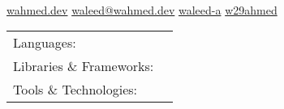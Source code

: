 \documentclass[]{awesome-cv}
\begin{document}
    
\begin{center}
	  \\
	\vspace{2mm}
	\href{https://wahmed.dev}{{\textcolor{darkblue}{\faGlobe} wahmed.dev}}
	\hspace{2mm}
	\href{mailto:waleed@wahmed.dev}{{\textcolor{darkblue}{\faEnvelope} waleed@wahmed.dev}}
	\hspace{2mm}
	\href{https://www.linkedin.com/in/waleed-a}{{\textcolor{darkblue}{\faLinkedin} waleed-a}}
	\hspace{2mm} 
	\href{https://github.com/w29ahmed}{{\textcolor{darkblue}{\faGithub} w29ahmed}}
\end{center}
\vspace{-4mm}
\begin{cventries}
	\cventry
	{}
	{\def\arraystretch{1.15}{\begin{tabular}{ l l }
		Languages:  & \hspace{1mm} {\skill{ C++, C, Python, Rust, Bash, JavaScript, Java, C\#, SQL }} \\
		Libraries \& Frameworks:  & \hspace{1mm} {\skill{ ROS, Protobufs, DDS, OpenCV, Node, React, Express, Flask, Google Test, Pytest }} \\
		Tools \& Technologies:  & \hspace{1mm} {\skill{ Git, Linux, Bazel, Docker, Elasticsearch, Grafana, Bamboo, Jenkins, Jira, LaTeX }} \\
		\end{tabular}}}
	{}
	{}
	{}
\end{cventries}

\vspace{-7mm}
\end{document}
